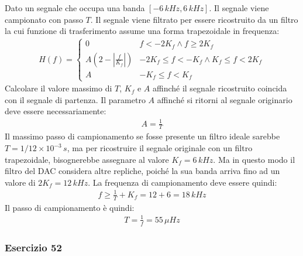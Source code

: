 \documentclass{article}
\begin{document}
Dato un segnale che occupa una banda $[-6\,kHz, 6\,kHz]$. Il segnale viene campionato con passo $T$. Il segnale viene filtrato per essere ricostruito da un filtro 
la cui funzione di trasferimento assume una forma trapezoidale in frequenza:
\begin{gather*}
    H(f)=\begin{cases}
        0 &f<-2K_f\land f\geq 2K_f\\
        A\left(2-\left|\displaystyle\frac{f}{K_f}\right|\right) &-2K_f\leq f<-K_f\land K_f\leq f<2K_f\\
        A & -K_f\leq f<K_f
    \end{cases}
\end{gather*}
Calcolare il valore massimo di $T$, $K_f$ e $A$ affinché il segnale ricostruito coincida con il segnale di partenza. 
Il parametro $A$ affinché si ritorni al segnale originario deve essere necessariamente: 
\begin{gather}
    A=\displaystyle\frac{1}{T}
\end{gather}
Il massimo passo di campionamento se fosse presente un filtro ideale sarebbe $T=1/12\times10^{-3}\,s$, ma per ricostruire il segnale originale con un filtro trapezoidale, bisognerebbe 
assegnare al valore $K_f=6\,kHz$. Ma in questo modo il filtro del DAC considera altre repliche, poiché la sua banda arriva fino ad un valore di $2K_f=12\,kHz$. La frequenza di 
campionamento deve essere quindi:
\begin{gather*}
    f\geq\displaystyle\frac{1}{T}+K_f=12+6=18\,kHz
\end{gather*}
Il passo di campionamento è quindi:
\begin{gather}
    T=\displaystyle\frac{1}{f}=55\,\mu Hz
\end{gather}

\subsubsection*{Esercizio 52}
\end{document}
